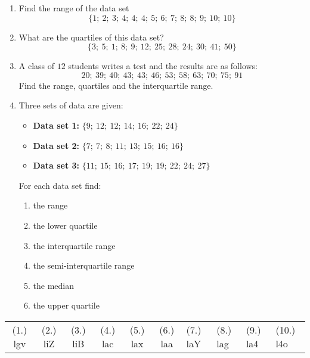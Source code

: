 \begin{exercises}{}{
  \begin{enumerate}[noitemsep, label=\textbf{\arabic*}.]

  \item Find the range of the data set
    \begin{equation*}
      \{1;\ 2;\ 3;\ 4;\ 4;\ 4;\ 5;\ 6;\ 7;\ 8;\ 8;\ 9;\ 10;\ 10\}
    \end{equation*}

  \item What are the quartiles of this data set?
    \begin{equation*}
      \{3;\ 5;\ 1;\ 8;\ 9;\ 12;\ 25;\ 28;\ 24;\ 30;\ 41;\ 50\}
    \end{equation*}

  \item A class of $12$ students writes a test and the results are as
    follows:
    \begin{equation*}
      20;\ 39;\ 40;\ 43;\ 43;\ 46;\ 53;\ 58;\ 63;\ 70;\ 75;\ 91
    \end{equation*}
    Find the range, quartiles and the interquartile range.

  \item Three sets of data are given:
    \begin{itemize}  
    \item \textbf{Data set 1:} $\{9;\ 12;\ 12;\ 14;\ 16;\ 22;\ 24\}$
    \item \textbf{Data set 2:} $\{7;\ 7;\ 8;\ 11;\ 13;\ 15;\ 16;\ 16\}$
    \item \textbf{Data set 3:} $\{11;\ 15;\ 16;\ 17;\ 19;\ 19;\ 22;\ 24;\ 27\}$
    \end{itemize}
    For each data set find:
    \begin{enumerate}  \begin{enumerate}[noitemsep, label=\textbf{(\alph*)} ]
    \item the range
    \item the lower quartile
    \item the interquartile range
    \item the semi-interquartile range
    \item the median
    \item the upper quartile
    \end{enumerate}
  \end{enumerate}
  \end{enumerate}
\practiceinfo
\par 
\par \begin{tabular}[h]{cccccc}
(1.) lgv  &  (2.) liZ  &  (3.) liB  &  (4.) lac  &  (5.) lax  &  (6.) laa  &  (7.) laY  &  (8.) lag  &  (9.) la4  &  (10.) l4o  & \end{tabular}
}
\end{exercises}


